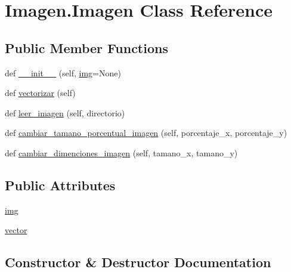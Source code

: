 \hypertarget{class_imagen_1_1_imagen}{}\section{Imagen.\+Imagen Class Reference}
\label{class_imagen_1_1_imagen}
\subsection*{Public Member Functions}
\begin{DoxyCompactItemize}
\item 
def \mbox{\hyperlink{class_imagen_1_1_imagen_af56feb3348d81937a479c64de374d422}{\+\_\+\+\_\+init\+\_\+\+\_\+}} (self, \mbox{\hyperlink{class_imagen_1_1_imagen_ae3a41e1a6fae0affa3b4735c50212093}{img}}=None)
\item 
def \mbox{\hyperlink{class_imagen_1_1_imagen_a4cdb42ba6cf651b032e66111f2a28219}{vectorizar}} (self)
\item 
def \mbox{\hyperlink{class_imagen_1_1_imagen_a76c63b1c129f5ef3e7ea63802209e645}{leer\+\_\+imagen}} (self, directorio)
\item 
def \mbox{\hyperlink{class_imagen_1_1_imagen_a5e3ac172693ba05dc2784b8ed4dccf0b}{cambiar\+\_\+tamano\+\_\+porcentual\+\_\+imagen}} (self, porcentaje\+\_\+x, porcentaje\+\_\+y)
\item 
def \mbox{\hyperlink{class_imagen_1_1_imagen_a6af5c7d6010936e477afa8bb52a4e2a6}{cambiar\+\_\+dimenciones\+\_\+imagen}} (self, tamano\+\_\+x, tamano\+\_\+y)
\end{DoxyCompactItemize}
\subsection*{Public Attributes}
\begin{DoxyCompactItemize}
\item 
\mbox{\hyperlink{class_imagen_1_1_imagen_ae3a41e1a6fae0affa3b4735c50212093}{img}}
\item 
\mbox{\hyperlink{class_imagen_1_1_imagen_ad7ff22a9f89ed827ec52d0ccd8934141}{vector}}
\end{DoxyCompactItemize}


\subsection{Constructor \& Destructor Documentation}
\mbox{\label{class_imagen_1_1_imagen_af56feb3348d81937a479c64de374d422}} 
